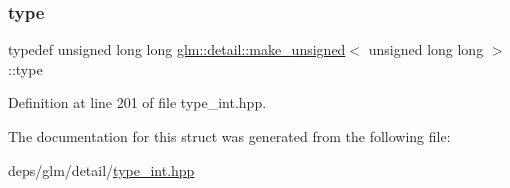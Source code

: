 \subsubsection{\texorpdfstring{type}{type}}
{\footnotesize\ttfamily typedef unsigned long long \hyperlink{structglm_1_1detail_1_1make__unsigned}{glm\+::detail\+::make\+\_\+unsigned}$<$ unsigned long long $>$\+::type}



Definition at line 201 of file type\+\_\+int.\+hpp.



The documentation for this struct was generated from the following file\+:\begin{DoxyCompactItemize}
\item 
deps/glm/detail/\hyperlink{type__int_8hpp}{type\+\_\+int.\+hpp}\end{DoxyCompactItemize}
